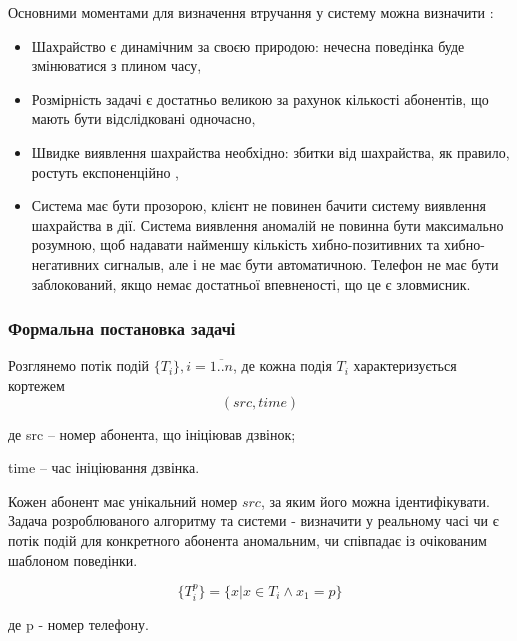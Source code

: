 Основними моментами для визначення втручання у систему можна визначити \cite{barson1996detection}:

\begin{itemize}
  \item Шахрайство є динамічним за своєю природою: нечесна поведінка буде змінюватися з плином часу,
  \item Розмірність задачі є достатньо великою за рахунок кількості абонентів, що мають бути відслідковані одночасно,
  \item Швидке виявлення шахрайства необхідно: збитки від шахрайства, як правило, ростуть експоненційно \cite{bliss1993fraud},
  \item Система має бути прозорою, клієнт не повинен бачити систему виявлення шахрайства в дії. Система виявлення аномалій не повинна бути максимально розумною, щоб надавати найменшу кількість хибно-позитивних та хибно-негативних сигналыв, але і не має бути автоматичною. Телефон не має бути заблокований, якщо немає достатньої впевненості, що це є зловмисник.
\end{itemize}

\subsubsection{Формальна постановка задачі}


  Розглянемо потік подій $\{T_i\}, i = \overline{1..n}$, де кожна подія $T_i$ характеризується кортежем
  \begin{equation}\label{eq:tuple} (src, time) \end{equation}
  \begin{ESKDexplanation}
    \item де src -- номер абонента, що ініціював дзвінок;
    \item time -- час ініціювання дзвінка.
  \end{ESKDexplanation}

  Кожен абонент має унікальний номер $src$, за яким його можна ідентифікувати. Задача розроблюваного алгоритму та системи - визначити у реальному часі чи є потік подій для конкретного абонента аномальним, чи співпадає із очікованим шаблоном поведінки.

  \begin{equation}\label{eq:stream}\{T_i^{p}\} = \{x | x \in T_i \wedge x_1 = p\}\end{equation}
  \begin{ESKDexplanation}
    \item де p - номер телефону.
  \end{ESKDexplanation}

